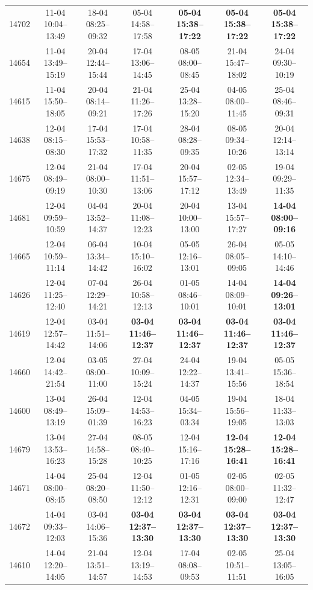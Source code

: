 \begin{table}[htbp]
\begin{tabular}{|r|c|c|c|c|c|c|}
14702 & 11-04 10:04--13:49 & 18-04 08:25--09:32 & 05-04 14:58--17:58 & \textbf{05-04 15:38--17:22} & \textbf{05-04 15:38--17:22} & \textbf{05-04 15:38--17:22} \\ 
14654 & 11-04 13:49--15:19 & 20-04 12:44--15:44 & 17-04 13:06--14:45 & 08-05 08:00--08:45 & 21-04 15:47--18:02 & 24-04 09:30--10:19 \\ 
14615 & 11-04 15:50--18:05 & 20-04 08:14--09:21 & 21-04 11:26--17:26 & 25-04 13:28--15:20 & 04-05 08:00--11:45 & 25-04 08:46--09:31 \\ 
14638 & 12-04 08:15--08:30 & 17-04 15:53--17:32 & 17-04 10:58--11:35 & 28-04 08:28--09:35 & 08-05 09:34--10:26 & 20-04 12:14--13:14 \\ 
14675 & 12-04 08:49--09:19 & 21-04 08:00--10:30 & 17-04 11:51--13:06 & 20-04 15:57--17:12 & 02-05 12:34--13:49 & 19-04 09:29--11:35 \\ 
14681 & 12-04 09:59--10:59 & 04-04 13:52--14:37 & 20-04 11:08--12:23 & 20-04 10:00--13:00 & 13-04 15:57--17:27 & \textbf{14-04 08:00--09:16} \\ 
14665 & 12-04 10:59--11:14 & 06-04 13:34--14:42 & 10-04 15:10--16:02 & 05-05 12:16--13:01 & 26-04 08:05--09:05 & 05-05 14:10--14:46 \\ 
14626 & 12-04 11:25--12:40 & 07-04 12:29--14:21 & 26-04 10:58--12:13 & 01-05 08:46--10:01 & 14-04 08:09--10:01 & \textbf{14-04 09:26--13:01} \\ 
14619 & 12-04 12:57--14:42 & 03-04 11:51--14:06 & \textbf{03-04 11:46--12:37} & \textbf{03-04 11:46--12:37} & \textbf{03-04 11:46--12:37} & \textbf{03-04 11:46--12:37} \\ 
14660 & 12-04 14:42--21:54 & 03-05 08:00--11:00 & 27-04 10:09--15:24 & 24-04 12:22--14:37 & 19-04 13:41--15:56 & 05-05 15:36--18:54 \\ 
14600 & 13-04 08:49--13:19 & 26-04 15:09--01:39 & 12-04 14:53--16:23 & 04-05 15:34--03:34 & 19-04 15:56--19:05 & 18-04 11:33--13:03 \\ 
14679 & 13-04 13:53--16:23 & 27-04 14:58--15:28 & 08-05 08:40--10:25 & 12-04 15:16--17:16 & \textbf{12-04 15:28--16:41} & \textbf{12-04 15:28--16:41} \\ 
14671 & 14-04 08:00--08:45 & 25-04 08:20--08:50 & 12-04 11:50--12:12 & 01-05 12:16--12:31 & 02-05 08:00--09:00 & 02-05 11:32--12:47 \\ 
14672 & 14-04 09:33--12:03 & 03-04 14:06--15:36 & \textbf{03-04 12:37--13:30} & \textbf{03-04 12:37--13:30} & \textbf{03-04 12:37--13:30} & \textbf{03-04 12:37--13:30} \\ 
14610 & 14-04 12:20--14:05 & 21-04 13:51--14:57 & 12-04 13:19--14:53 & 17-04 08:08--09:53 & 02-05 10:51--11:51 & 25-04 13:05--16:05 \\ 

\end{tabular}
\end{table}
